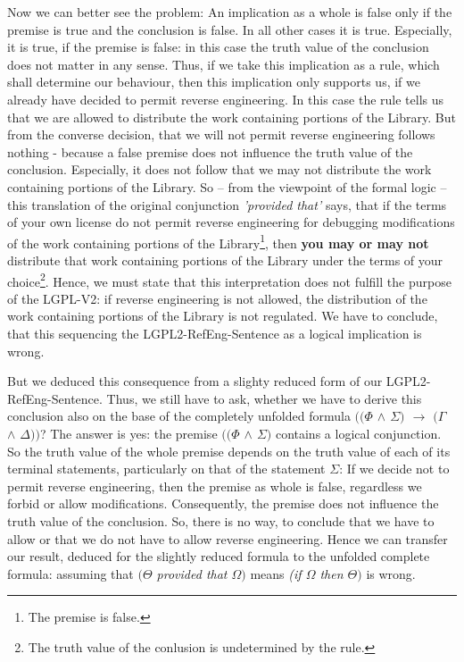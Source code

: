 Now we can better see the problem: An implication as a whole is false only if
the premise is true and the conclusion is false. In all other cases it is true.
Especially, it is true, if the premise is false: in this case the truth value of
the conclusion does not matter in any sense. Thus, if we take this implication
as a rule, which shall determine our behaviour, then this implication only
supports us, if we already have decided to permit reverse engineering. In this
case the rule tells us that we are allowed to distribute the work containing
portions of the Library. But from the converse decision, that we will not permit
reverse engineering follows nothing - because a false premise does not influence
the truth value of the conclusion. Especially, it does not follow that we may
not distribute the work containing portions of the Library. So -- from the
viewpoint of the formal logic -- this translation of the original conjunction 
\emph{'provided that'} says, that if the terms of your own license do not permit
reverse engineering for debugging modifications of the work containing portions
of the Library\footnote{The premise is false.}, then \textbf{you may or may not}
distribute that work containing portions of the Library under the terms of your
choice\footnote{The truth value of the conlusion is undetermined by the rule.}.
Hence, we must state that this interpretation does not fulfill the purpose of
the LGPL-V2: if reverse engineering is not allowed, the distribution of the work
containing portions of the Library is not regulated. We have to conclude, that
this sequencing the LGPL2-RefEng-Sentence as a logical implication is wrong.

But we deduced this consequence from a slighty reduced form of our
LGPL2-RefEng-Sentence. Thus, we still have to ask, whether we have to derive
this conclusion also on the base of the completely unfolded formula
\emph{$((\Phi$ $\wedge$ $\Sigma)$ $\rightarrow$ $(\Gamma$ $\wedge$ $\Delta))$}?
The answer is yes: the premise \emph{$((\Phi$ $\wedge$ $\Sigma)$} contains a
logical conjunction. So the truth value of the whole premise depends on the
truth value of each of its terminal statements, particularly on that of the
statement $\Sigma$: If we decide not to permit reverse engineering, then the
premise as whole is false, regardless we forbid or allow modifications.
Consequently, the premise does not influence the truth value of the conclusion.
So, there is no way, to conclude that we have to allow or that we do not have to
allow reverse engineering. Hence we can transfer our result, deduced for the
slightly reduced formula to the unfolded complete formula: assuming that
\emph{$(\Theta$ provided that $\Omega)$} means \emph{(if $\Omega$ then
$\Theta)$} is wrong.

